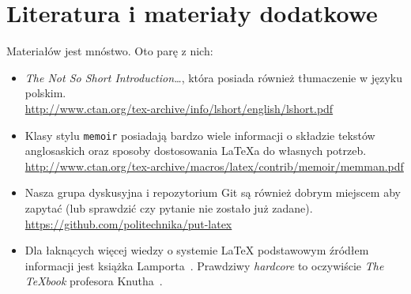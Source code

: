 \section{Literatura i materiały dodatkowe}

Materiałów jest mnóstwo. Oto parę z nich:
\begin{itemize}
    \item \emph{The Not So Short Introduction\ldots}, która posiada również tłumaczenie 
    w języku polskim.\\
    \url{http://www.ctan.org/tex-archive/info/lshort/english/lshort.pdf}

    \item Klasy stylu \texttt{memoir} posiadają bardzo wiele informacji o składzie tekstów
    anglosaskich oraz sposoby dostosowania \LaTeX{}a do własnych potrzeb.\\
    \url{http://www.ctan.org/tex-archive/macros/latex/contrib/memoir/memman.pdf}
    
    \item Nasza grupa dyskusyjna i repozytorium Git są również dobrym miejscem aby zapytać
    (lub sprawdzić czy pytanie nie zostało już zadane).\\
    \url{https://github.com/politechnika/put-latex}

    \item Dla łaknących więcej wiedzy o systemie LaTeX podstawowym źródłem informacji
    jest książka Lamporta~\cite{Lamport1985}. Prawdziwy \emph{hardcore} to oczywiście
    \emph{The \TeX{}book} profesora Knutha~\cite{Knuth1986}.
\end{itemize}

